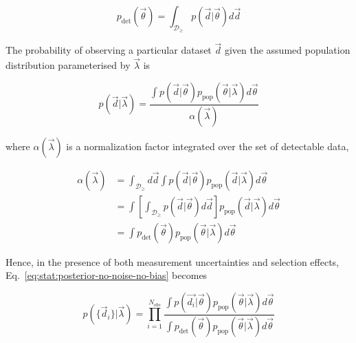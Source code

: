 \documentclass[%
preprint,
 amsmath,amssymb,
 aps,
]{revtex4-2}
\newcommand{\given}[2]{p( #1 | #2 )}
\newcommand{\ppop}[0]{p_{\text{pop}}}
\newcommand{\pdet}[0]{p_{\text{det}}}
\begin{document}
\begin{equation}
	\pdet(\vec{\theta}) = \int_{\mathcal{D}_\geq} \given{\vec{d}}{\vec{\theta}}d\vec{d}
\end{equation}

The probability of observing a particular dataset $\vec{d}$ given the assumed population
distribution parameterised by $\vec{\lambda}$ is

\begin{equation}
	\given{\vec{d}}{\vec{\lambda}} =
	\frac{\int \given{\vec{d}}{\vec{\theta}} \ppop(\vec{\theta} | \vec{\lambda} ) d\vec{\theta}}{\alpha(\vec{\lambda})}
\end{equation}

where $\alpha(\vec{\lambda})$ is a normalization factor integrated over the set of detectable data,

\begin{align}
	\alpha(\vec{\lambda}) & =
	\int_{\mathcal{D}_\geq} d\vec{d} \int \given{\vec{d}}{\vec{\theta}} \ppop(\vec{d} | \vec{\lambda} ) d\vec{\theta}                                           \\
	                      & = \int \left[ \int_{\mathcal{D}_\geq} \given{\vec{d}}{\vec{\theta}} d\vec{d} \right]  \ppop(\vec{d} | \vec{\lambda} ) d\vec{\theta} \\
	                      & = \int \pdet(\vec{\theta}) \ppop(\vec{\theta} | \vec{\lambda} ) d\vec{\theta}
\end{align}

Hence, in the presence of both measurement uncertainties and selection effects,
Eq.~\eqref{eq:stat:posterior-no-noise-no-bias} becomes

\begin{equation}
	\given{\{ \vec{d}_i \}}{\vec{\lambda}} =
	\prod_{i=1}^{N_{obs}}
	\frac{\int \given{\vec{d_i}}{\vec{\theta}} \ppop(\vec{\theta} | \vec{\lambda} ) d\vec{\theta}}{\int \pdet(\vec{\theta}) \ppop(\vec{\theta} | \vec{\lambda} ) d\vec{\theta}}
\end{equation}

\end{document}
